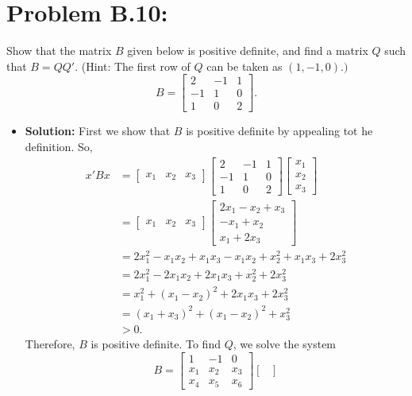 \documentclass[11pt]{article}
\begin{document}
\section*{Problem B.10:}
Show that the matrix $B$ given below is positive definite, and find a matrix $Q$ such that $B=QQ'$.  (Hint:  The first row of $Q$ can be taken as $(1,-1,0).)$
\[
B = \begin{bmatrix}
2 & -1 & 1 \\
-1 & 1 & 0 \\
1 & 0 & 2
\end{bmatrix}.
\]
\begin{itemize}
\item[] {\bf Solution:}  First we show that $B$ is positive definite by appealing tot he definition.  So,
\begin{align*}
x'Bx &= \begin{bmatrix}
x_1 & x_2 & x_3
\end{bmatrix}\begin{bmatrix}
2 & -1 & 1 \\
-1 & 1 & 0 \\
1 & 0 & 2
\end{bmatrix}\begin{bmatrix}
x_1 \\ x_2 \\ x_3
\end{bmatrix} \\
&= \begin{bmatrix}
x_1 & x_2 & x_3
\end{bmatrix}\begin{bmatrix}
2x_1 - x_2 + x_3 \\
-x_1 + x_2 \\
x_1 + 2x_3
\end{bmatrix} \\
&= 2x_1^2 - x_1x_2 + x_1x_3 - x_1x_2 + x_2^2 + x_1x_3 + 2x_3^2 \\
&= 2x_1^2 - 2x_1x_2 + 2x_1x_3 + x_2^2 + 2x_3^2 \\
&= x_1^2 + (x_1 - x_2)^2 + 2x_1x_3 + 2x_3^2 \\
&= (x_1+x_3)^2 + (x_1-x_2)^2 + x_3^2 \\
&> 0.
\end{align*}
Therefore, $B$ is positive definite.
To find $Q$, we solve the system
\[
B = \begin{bmatrix}
1 & -1 & 0 \\
x_1 & x_2 & x_3 \\
x_4 & x_5 & x_6
\end{bmatrix} \begin{bmatrix}

\end{bmatrix}\]
\end{itemize}
\end{document}
